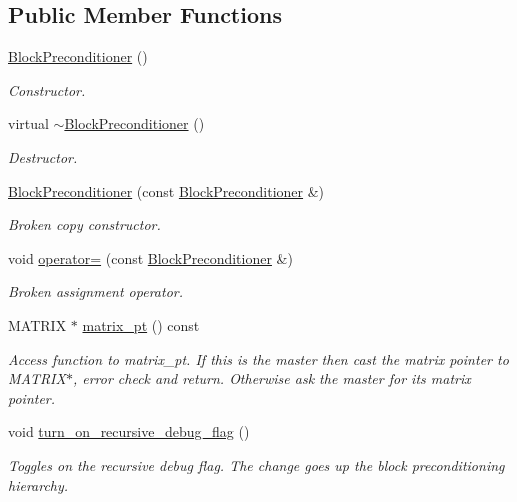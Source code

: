 \subsection*{Public Member Functions}
\begin{DoxyCompactItemize}
\item 
\hyperlink{classoomph_1_1BlockPreconditioner_a74c4b4bef4371b72816631445689a2e6}{Block\+Preconditioner} ()
\begin{DoxyCompactList}\small\item\em Constructor. \end{DoxyCompactList}\item 
virtual \hyperlink{classoomph_1_1BlockPreconditioner_a78c33fc6f29101f027e22d64d158d567}{$\sim$\+Block\+Preconditioner} ()
\begin{DoxyCompactList}\small\item\em Destructor. \end{DoxyCompactList}\item 
\hyperlink{classoomph_1_1BlockPreconditioner_a9652c8d4fb3cdbd8216f13c356324170}{Block\+Preconditioner} (const \hyperlink{classoomph_1_1BlockPreconditioner}{Block\+Preconditioner} \&)
\begin{DoxyCompactList}\small\item\em Broken copy constructor. \end{DoxyCompactList}\item 
void \hyperlink{classoomph_1_1BlockPreconditioner_a910f9395fa4f5f9bc4d13a9d104c432d}{operator=} (const \hyperlink{classoomph_1_1BlockPreconditioner}{Block\+Preconditioner} \&)
\begin{DoxyCompactList}\small\item\em Broken assignment operator. \end{DoxyCompactList}\item 
M\+A\+T\+R\+IX $\ast$ \hyperlink{classoomph_1_1BlockPreconditioner_a9aac48fd53e579e6db8eeed58933a14b}{matrix\+\_\+pt} () const
\begin{DoxyCompactList}\small\item\em Access function to matrix\+\_\+pt. If this is the master then cast the matrix pointer to M\+A\+T\+R\+I\+X$\ast$, error check and return. Otherwise ask the master for its matrix pointer. \end{DoxyCompactList}\item 
void \hyperlink{classoomph_1_1BlockPreconditioner_a0d977a81515458e59b94438a215e93e1}{turn\+\_\+on\+\_\+recursive\+\_\+debug\+\_\+flag} ()
\begin{DoxyCompactList}\small\item\em Toggles on the recursive debug flag. The change goes up the block preconditioning hierarchy. \end{DoxyCompactList}\item 

\end{DoxyCompactItemize}
